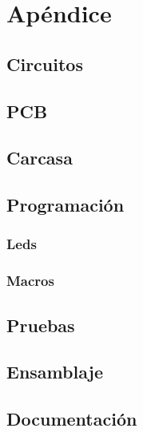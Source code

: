 \chapter{Apéndice}
\section{Circuitos}
\section{\gls{PCB}}
\section{Carcasa}
\section{Programación}
\subsection{Leds} \label{ApendiceLeds}
\subsection{Macros} \label{ApendiceMacros}

\section{Pruebas}
\section{Ensamblaje}
\section{Documentación}
